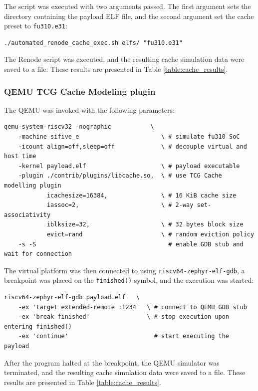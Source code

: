 \noindent The script was executed with two arguments passed. The first argument sets the directory containing the payload ELF file, and the second argument set the cache preset to \texttt{fu310.e31}:
\begin{verbatim}
./automated_renode_cache_exec.sh elfs/ "fu310.e31"
\end{verbatim}

\noindent The Renode script was executed, and the resulting cache simulation data were saved to a file. These results are presented in Table \ref{table:cache_results}.


\subsubsection{QEMU TCG Cache Modeling plugin}
The QEMU was invoked with the following parameters:
\begin{verbatim}
qemu-system-riscv32 -nographic           \
	-machine sifive_e                       \ # simulate fu310 SoC
	-icount align=off,sleep=off             \ # decouple virtual and host time
	-kernel payload.elf                     \ # payload executable
	-plugin ./contrib/plugins/libcache.so,  \ # use TCG Cache modelling plugin
	        icachesize=16384,               \ # 16 KiB cache size
	        iassoc=2,                       \ # 2-way set-associativity
	        iblksize=32,                    \ # 32 bytes block size
	        evict=rand                      \ # random eviction policy
	-s -S                                     # enable GDB stub and wait for connection
\end{verbatim}

\noindent The virtual platform was then connected to using \texttt{riscv64-zephyr-elf-gdb}, a breakpoint was placed on the \texttt{finished()} symbol, and the execution was started:
\begin{verbatim}
riscv64-zephyr-elf-gdb payload.elf   \
	-ex 'target extended-remote :1234'  \ # connect to QEMU GDB stub
	-ex 'break finished'                \ # stop execution upon entering finished()
	-ex 'continue'                        # start executing the payload
\end{verbatim}

\noindent After the program halted at the breakpoint, the QEMU simulator was terminated, and the resulting cache simulation data were saved to a file. These results are presented in %
Table \ref{table:cache_results}.


